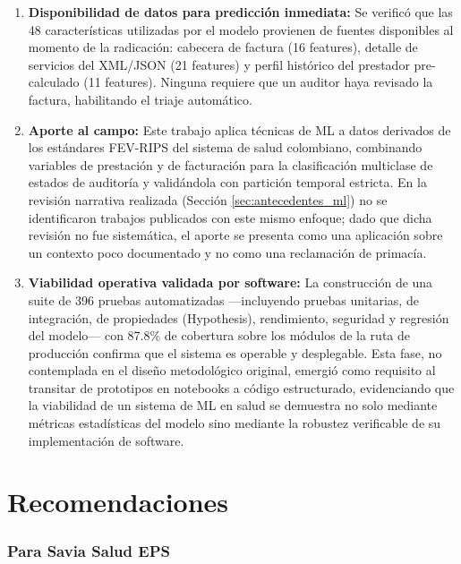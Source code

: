 \documentclass[12pt,letterpaper]{report}
\begin{document}
\begin{enumerate}
    \item \textbf{Disponibilidad de datos para predicción inmediata:} Se verificó que las 48 características utilizadas por el modelo provienen de fuentes disponibles al momento de la radicación: cabecera de factura (16 features), detalle de servicios del XML/JSON (21 features) y perfil histórico del prestador pre-calculado (11 features). Ninguna requiere que un auditor haya revisado la factura, habilitando el triaje automático.

    \item \textbf{Aporte al campo:} Este trabajo aplica técnicas de ML a datos derivados de los estándares FEV-RIPS del sistema de salud colombiano, combinando variables de prestación y de facturación para la clasificación multiclase de estados de auditoría y validándola con partición temporal estricta. En la revisión narrativa realizada (Sección \ref{sec:antecedentes_ml}) no se identificaron trabajos publicados con este mismo enfoque; dado que dicha revisión no fue sistemática, el aporte se presenta como una aplicación sobre un contexto poco documentado y no como una reclamación de primacía.

    \item \textbf{Viabilidad operativa validada por software:} La construcción de una suite de 396 pruebas automatizadas —incluyendo pruebas unitarias, de integración, de propiedades (Hypothesis), rendimiento, seguridad y regresión del modelo— con 87.8\% de cobertura sobre los módulos de la ruta de producción confirma que el sistema es operable y desplegable. Esta fase, no contemplada en el diseño metodológico original, emergió como requisito al transitar de prototipos en notebooks a código estructurado, evidenciando que la viabilidad de un sistema de ML en salud se demuestra no solo mediante métricas estadísticas del modelo sino mediante la robustez verificable de su implementación de software.
\end{enumerate}

\chapter{Recomendaciones}

\subsection*{Para Savia Salud EPS}
\end{document}
